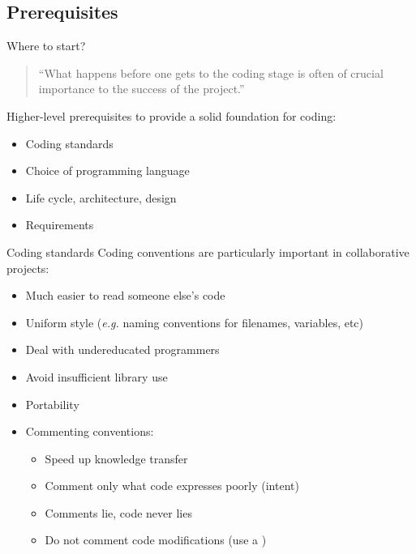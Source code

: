 \documentclass{beamer}
\newcommand{\itemd}{\item[-]}
\begin{document}
\subsection{Prerequisites}
\begin{frame}{Where to start?}
	\begin{quote}
		\enquote{What happens before one gets to the coding stage is often of crucial importance to the success of the project.}
	\end{quote}
	\vspace{1\baselineskip}
	Higher-level prerequisites to provide a solid foundation for coding:
	\begin{itemize}
		\item Coding standards
		\item Choice of programming language
		\item Life cycle, architecture, design
		\item \alert{Requirements}
	\end{itemize}
\end{frame}

\begin{frame}{Coding standards}
	Coding conventions are particularly important in collaborative projects:
	\begin{itemize}
		\item Much easier to read someone else's code
		\item Uniform style (\textit{e.g.} naming conventions for filenames, variables, etc)
		\item Deal with undereducated programmers
		\item Avoid insufficient library use
		\item Portability
		\item Commenting conventions:
			\begin{itemize}
				\itemd Speed up knowledge transfer
				\itemd Comment only what code expresses poorly (intent)
				\itemd Comments lie, code never lies
				\itemd Do not comment code modifications (use a )
			\end{itemize}
	\end{itemize}
\end{frame}
\end{document}
